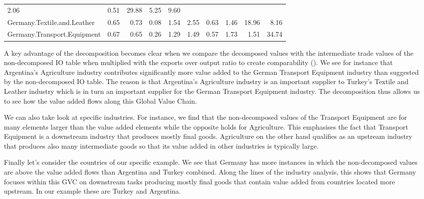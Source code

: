 \documentclass[a4paper]{article}\usepackage[]{graphicx}\usepackage[]{color}
\providecommand{\tabularnewline}{\\}
\begin{document}
\begin{sidewaystable}
\begin{tabular}{lrrrrrrrrr}
{\scriptsize{}2.06 } &
{\scriptsize{}0.51 } &
{\scriptsize{}29.88 } &
{\scriptsize{}5.25 } &
{\scriptsize{}9.60 }\tabularnewline
{\scriptsize{}Germany.Textile.and.Leather } &
{\scriptsize{}0.65 } &
{\scriptsize{}0.73 } &
{\scriptsize{}0.08 } &
{\scriptsize{}1.54 } &
{\scriptsize{}2.55 } &
{\scriptsize{}0.63 } &
{\scriptsize{}1.46 } &
{\scriptsize{}18.96 } &
{\scriptsize{}8.16 }\tabularnewline
{\scriptsize{}Germany.Transport.Equipment } &
{\scriptsize{}0.67 } &
{\scriptsize{}0.65 } &
{\scriptsize{}0.26 } &
{\scriptsize{}1.29 } &
{\scriptsize{}1.49 } &
{\scriptsize{}0.57 } &
{\scriptsize{}1.73 } &
{\scriptsize{}1.51 } &
{\scriptsize{}34.74 }\tabularnewline
\hline 
\end{tabular}{\scriptsize \par}
\end{sidewaystable}

A key advantage of the decomposition becomes clear when we compare
the decomposed values with the intermediate trade values of the non-decomposed
IO table when multiplied with the exports over output ratio to create
comparability (). We see for instance that
Argentina's Agriculture industry contributes significantly more value
added to the German Transport Equipment industry than suggested by
the non-decomposed IO table. The reason is that Argentina's Agriculture
industry is an important supplier to Turkey's Textile and Leather
industry which is in turn an important supplier for the German Transport
Equipment industry. The decomposition thus allows us to see how the
value added flows along this Global Value Chain.

We can also take look at specific industries. For instance, we find
that the non-decomposed values of the Transport Equipment are for
many elements larger than the value added elements while the opposite
holds for Agriculture. This emphasises the fact that Transport Equipment
is a downstream industry that produces mostly final goods. Agriculture
on the other hand qualifies as an upstream industry that produces
also many intermediate goods so that its value added in other industries
is typically large.

Finally let's consider the countries of our specific example. We see
that Germany has more instances in which the non-decomposed values
are above the value added flows than Argentina and Turkey combined.
Along the lines of the industry analysis, this shows that Germany
focuses within this GVC on downstream tasks producing mostly final
goods that contain value added from countries located more upstream.
In our example these are Turkey and Argentina.
\end{document}
